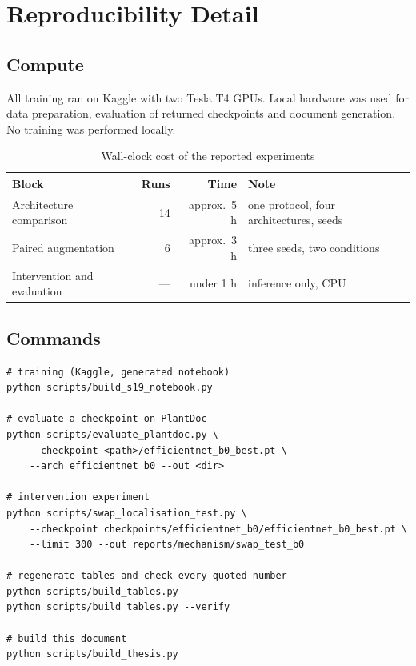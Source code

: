 
\chapter{Reproducibility Detail}
\label{ch:appendix}

\section{Compute}

All training ran on Kaggle with two Tesla T4 GPUs. Local hardware was used for data
preparation, evaluation of returned checkpoints and document generation. No training
was performed locally.

\begin{table}[H]
\centering
\caption{Wall-clock cost of the reported experiments}
\label{tab:compute}
\tabfont
\begin{tabularx}{\textwidth}{@{}lrrY@{}}
\toprule
\textbf{Block} & \textbf{Runs} & \textbf{Time} & \textbf{Note} \\
\midrule
Architecture comparison & 14 & approx.\ 5 h & one protocol, four architectures, seeds \\
Paired augmentation & 6 & approx.\ 3 h & three seeds, two conditions \\
Intervention and evaluation & --- & under 1 h & inference only, CPU \\
\bottomrule
\end{tabularx}
\end{table}

\section{Commands}

\begin{verbatim}
# training (Kaggle, generated notebook)
python scripts/build_s19_notebook.py

# evaluate a checkpoint on PlantDoc
python scripts/evaluate_plantdoc.py \
    --checkpoint <path>/efficientnet_b0_best.pt \
    --arch efficientnet_b0 --out <dir>

# intervention experiment
python scripts/swap_localisation_test.py \
    --checkpoint checkpoints/efficientnet_b0/efficientnet_b0_best.pt \
    --limit 300 --out reports/mechanism/swap_test_b0

# regenerate tables and check every quoted number
python scripts/build_tables.py
python scripts/build_tables.py --verify

# build this document
python scripts/build_thesis.py
\end{verbatim}

